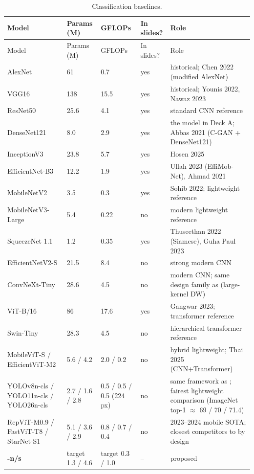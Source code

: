 \begin{longtable}{@{}L{3.6cm}L{1.6cm}L{1.6cm}L{1.6cm}L{6.6cm}@{}}
\caption{Classification baselines.}\label{tab:cls_baselines}\\
\toprule
Model & Params (M) & GFLOPs & In slides? & Role \\
\midrule
\endfirsthead
\toprule
Model & Params (M) & GFLOPs & In slides? & Role \\
\midrule
\endhead
\bottomrule
\endfoot
AlexNet & 61 & 0.7 & yes & historical; Chen 2022 (modified AlexNet) \\
VGG16 & 138 & 15.5 & yes & historical; Younis 2022, Nawaz 2023 \\
ResNet50 & 25.6 & 4.1 & yes & standard CNN reference \\
DenseNet121 & 8.0 & 2.9 & yes & the model in Deck A; Abbas 2021 (C-GAN + DenseNet121) \\
InceptionV3 & 23.8 & 5.7 & yes & Hosen 2025 \\
EfficientNet-B3 & 12.2 & 1.9 & yes & Ullah 2023 (EffiMob-Net), Ahmad 2021 \\
MobileNetV2 & 3.5 & 0.3 & yes & Sohib 2022; lightweight reference \\
MobileNetV3-Large & 5.4 & 0.22 & no & modern lightweight reference \\
SqueezeNet 1.1 & 1.2 & 0.35 & yes & Thuseethan 2022 (Siamese), Guha Paul 2023 \\
EfficientNetV2-S & 21.5 & 8.4 & no & strong modern CNN \\
ConvNeXt-Tiny & 28.6 & 4.5 & no & modern CNN; same design family as \model{} (large-kernel DW) \\
ViT-B/16 & 86 & 17.6 & yes & Gangwar 2023; transformer reference \\
Swin-Tiny & 28.3 & 4.5 & no & hierarchical transformer reference \\
MobileViT-S / EfficientViT-M2 & 5.6 / 4.2 & 2.0 / 0.2 & no & hybrid lightweight; Thai 2025 (CNN+Transformer) \\
YOLOv8n-cls / YOLO11n-cls / YOLO26n-cls & 2.7 / 1.6 / 2.8 & 0.5 / 0.5 / 0.5 (224 px) & no & same framework as \modelcls{}; fairest lightweight comparison (ImageNet top-1 $\approx$ 69 / 70 / 71.4) \\
RepViT-M0.9 / FastViT-T8 / StarNet-S1 & 5.1 / 3.6 / 2.9 & 0.8 / 0.7 / 0.4 & no & 2023--2024 mobile SOTA; closest competitors to \model{} by design \\
\textbf{\modelcls{}-n/s} & target 1.3 / 4.6 & target 0.3 / 1.0 & -- & proposed \\
\end{longtable}

